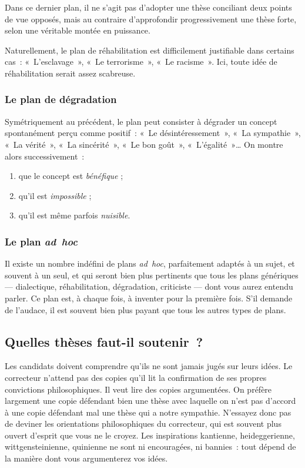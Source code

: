 \documentclass[a4paper]{article}
\begin{document}
Dans ce dernier plan, il ne s'agit pas d'adopter une thèse conciliant
deux points de vue opposés, mais au contraire d'approfondir
progressivement une thèse forte, selon une véritable montée en
puissance.

Naturellement, le plan de réhabilitation est difficilement justifiable
dans certains cas : « L'esclavage », « Le terrorisme », « Le racisme ». Ici,
toute idée de réhabilitation serait assez scabreuse.
\subsubsection{Le plan de dégradation}
\label{sec-3-2-4}


Symétriquement au précédent, le plan peut consister à dégrader un
concept spontanément perçu comme positif : « Le désintéressement », « La
sympathie », « La vérité », « La sincérité », « Le bon goût », « L'égalité »\ldots{}
On montre alors successivement :

\begin{enumerate}
\item que le concept est \emph{bénéfique} ;
\item qu'il est \emph{impossible} ;
\item qu'il est même parfois \emph{nuisible}.
\end{enumerate}
\subsubsection{Le plan \emph{ad hoc}}
\label{sec-3-2-5}


Il existe un nombre indéfini de plans \emph{ad hoc}, parfaitement adaptés à
un sujet, et souvent à un seul, et qui seront bien plus pertinents que
tous les plans génériques --- dialectique, réhabilitation, dégradation,
criticiste --- dont vous aurez entendu parler. Ce plan est, à chaque
fois, à inventer pour la première fois. S'il demande de l'audace, il est
souvent bien plus payant que tous les autres types de plans.
\subsection{Quelles thèses faut-il soutenir ?}
\label{sec-3-3}


Les candidats doivent comprendre qu'ils ne sont jamais jugés sur leurs
idées. Le correcteur n'attend pas des copies qu'il lit la confirmation
de ses propres convictions philosophiques. Il veut lire des copies
argumentées. On préfère largement une copie défendant bien une thèse
avec laquelle on n'est pas d'accord à une copie défendant mal une thèse
qui a notre sympathie. N'essayez donc pas de deviner les orientations
philosophiques du correcteur, qui est souvent plus ouvert d'esprit que
vous ne le croyez. Les inspirations kantienne, heideggerienne,
wittgensteinienne, quinienne ne sont ni encouragées, ni bannies : tout
dépend de la manière dont vous argumenterez vos idées.
\end{document}
